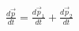 \documentclass[preview]{standalone}
\begin{document}
\begin{align*}
{\displaystyle {\frac {d{\vec {p}}}{dt}}={\frac {d{\vec {p}}_{1}}{dt}}+{\frac {d{\vec {p}}_{2}}{dt}}}
\end{align*}
\end{document}
